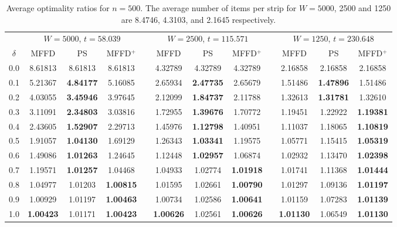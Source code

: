 \documentclass[oribibl]{llncs}
\begin{document}
\begin{table}[!htb]
	\centering
	\caption{Average optimality ratios for $n = 500$. The average number of items per strip for $W = 5000$, 2500 and 1250 are 8.4746, 4.3103, and 2.1645 respectively.}
	\begin{tabular}{@{}c@{\hspace{25pt}}c@{\hspace{8pt}}c@{\hspace{8pt}}ccc@{\hspace{8pt}}c@{\hspace{8pt}}ccc@{\hspace{8pt}}c@{\hspace{8pt}}c@{}}\toprule
		& \multicolumn{3}{c}{$W = 5000$, $t = 58.039$} & \phantom{abcd} & \multicolumn{3}{c}{$W = 2500$, $t = 115.571$} & \phantom{abcd} & \multicolumn{3}{c}{$W = 1250$, $t = 230.648$} \\
		\cmidrule{2-4} \cmidrule{6-8} \cmidrule{10-12}
		$\delta$ & MFFD & PS & MFFD$^+$ && MFFD & PS & MFFD$^+$ && MFFD & PS & MFFD$^+$\\ \midrule
		0.0 & 8.61813 & 8.61813 & 8.61813 && 4.32789 & 4.32789 & 4.32789 && 2.16858 & 2.16858 & 2.16858 \\
		0.1 & 5.21367 & \textbf{4.84177} & 5.16085 && 2.65934 & \textbf{2.47735} & 2.65679 && 1.51486 & \textbf{1.47896} & 1.51486 \\
		0.2 & 4.03055 & \textbf{3.45946} & 3.97645 && 2.12099 & \textbf{1.84737} & 2.11788 && 1.32613 & \textbf{1.31781} & 1.32610 \\
		0.3 & 3.11091 & \textbf{2.34803} & 3.03816 && 1.72955 & \textbf{1.39676} & 1.70772 && 1.19451 & 1.22922 & \textbf{1.19381} \\
		0.4 & 2.43605 & \textbf{1.52907} & 2.29713 && 1.45976 & \textbf{1.12798} & 1.40951 && 1.11037 & 1.18065 & \textbf{1.10819} \\
		0.5 & 1.91057 & \textbf{1.04130} & 1.69129 && 1.26343 & \textbf{1.03341} & 1.19575 && 1.05771 & 1.15415 & \textbf{1.05319} \\
		0.6 & 1.49086 & \textbf{1.01263} & 1.24645 && 1.12448 & \textbf{1.02957} & 1.06874 && 1.02932 & 1.13470 & \textbf{1.02398} \\
		0.7 & 1.19571 & \textbf{1.01257} & 1.04468 && 1.04933 & 1.02774 & \textbf{1.01918} && 1.01741 & 1.11368 & \textbf{1.01444} \\
		0.8 & 1.04977 & 1.01203 & \textbf{1.00815} && 1.01595 & 1.02661 & \textbf{1.00790} && 1.01297 & 1.09136 & \textbf{1.01197} \\
		0.9 & 1.00929 & 1.01197 & \textbf{1.00463} && 1.00734 & 1.02586 & \textbf{1.00641} && 1.01159 & 1.07283 & \textbf{1.01139} \\
		1.0 & \textbf{1.00423} & 1.01171 & \textbf{1.00423} && \textbf{1.00626} & 1.02561 & \textbf{1.00626} && \textbf{1.01130} & 1.06549 & \textbf{1.01130} \\
		\bottomrule
	\end{tabular}	
	\label{table:n=500}
\end{table}
\end{document}
